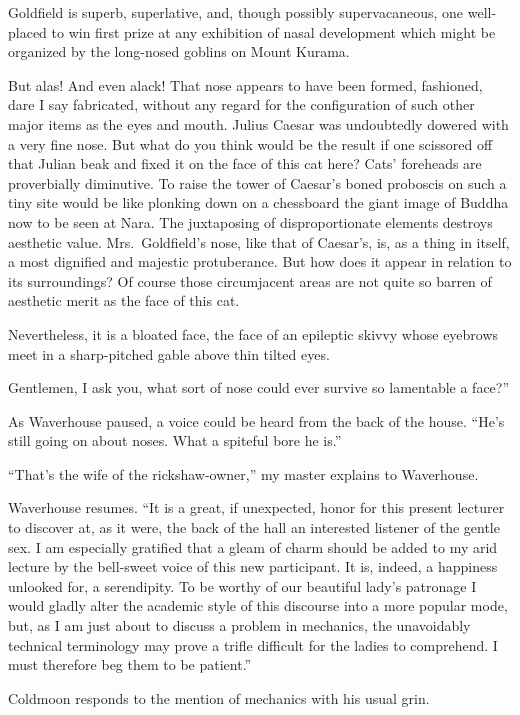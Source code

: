 \documentclass{book}
\begin{document}
Goldfield is superb, superlative, and, though possibly supervacaneous,
one well-placed to win first prize at any exhibition of nasal
development which might be organized by the long-nosed goblins on Mount
Kurama.

But alas! And even alack! That nose appears to have been formed,
fashioned, dare I say fabricated, without any regard for the
configuration of such other major items as the eyes and mouth. Julius
Caesar was undoubtedly dowered with a very fine nose. But what do you
think would be the result if one scissored off that Julian beak and
fixed it on the face of this cat here? Cats' foreheads are proverbially
diminutive. To raise the tower of Caesar's boned proboscis on such a
tiny site would be like plonking down on a chessboard the giant image of
Buddha now to be seen at Nara. The juxtaposing of disproportionate
elements destroys aesthetic value. Mrs.~Goldfield's nose, like that of
Caesar's, is, as a thing in itself, a most dignified and majestic
protuberance. But how does it appear in relation to its surroundings? Of
course those circumjacent areas are not quite so barren of aesthetic
merit as the face of this cat.

Nevertheless, it is a bloated face, the face of an epileptic skivvy
whose eyebrows meet in a sharp-pitched gable above thin tilted eyes.

Gentlemen, I ask you, what sort of nose could ever survive so lamentable
a face?''

As Waverhouse paused, a voice could be heard from the back of the house.
``He's still going on about noses. What a spiteful bore he is.''

``That's the wife of the rickshaw-owner,'' my master explains to
Waverhouse.

Waverhouse resumes. ``It is a great, if unexpected, honor for this
present lecturer to discover at, as it were, the back of the hall an
interested listener of the gentle sex. I am especially gratified that a
gleam of charm should be added to my arid lecture by the bell-sweet
voice of this new participant. It is, indeed, a happiness unlooked for,
a serendipity. To be worthy of our beautiful lady's patronage I would
gladly alter the academic style of this discourse into a more popular
mode, but, as I am just about to discuss a problem in mechanics, the
unavoidably technical terminology may prove a trifle difficult for the
ladies to comprehend. I must therefore beg them to be patient.''

Coldmoon responds to the mention of mechanics with his usual grin.
\end{document}
